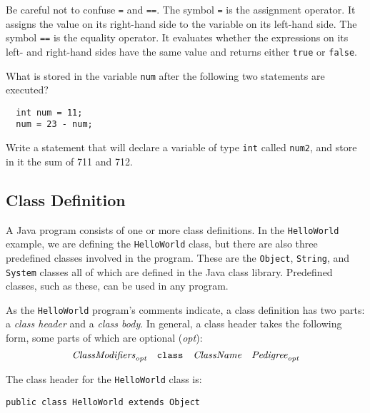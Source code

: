  {Be careful not to
confuse {\tt =} and {\tt ==}. The symbol {\tt =} is the assignment
operator. It assigns the value on its right-hand side to the variable
on its left-hand side. The symbol {\tt ==} is the equality
operator. It evaluates whether the expressions on its left- and
right-hand sides have the same value and returns either {\tt true} or
{\tt false}.}

\begin{SSTUDY}

\item What is stored in the variable {\tt num} after the following
two statements are executed?
\small
\begin{verbatim}
  int num = 11;
  num = 23 - num;
\end{verbatim}
\normalsize

\item Write a statement that will declare a variable of type {\tt int}
called {\tt num2}, and store in it the sum of 711 and 712. 

\end{SSTUDY}


\subsection{Class Definition}

\noindent A Java program consists of one or more class definitions. 
In the {\tt HelloWorld} example, we are defining the {\tt HelloWorld}
class, but there are also three predefined classes involved in the
program. These are the {\tt Object}, {\tt String}, and {\tt System}
classes all of which are defined in the Java class library. Predefined
classes, such as these, can be used in any program.

As the {\tt HelloWorld} program's comments indicate, a class definition
has two parts: a {\it class header} and a {\it class body}.  In
general, a class header takes the following form, some parts of which
are optional ({\em opt}):
$$
\hbox{\it ClassModifiers}_{\hbox{\scriptsize\it opt}}\quad
\hbox{\tt class}\quad
\hbox{\it ClassName}\quad
\hbox{\it Pedigree}_{\hbox{\scriptsize\it opt}}
$$

\noindent The class header for the {\tt HelloWorld} class is:

\begin{jjjlisting}
\begin{lstlisting}
public class HelloWorld extends Object
\end{lstlisting}
\end{jjjlisting}

